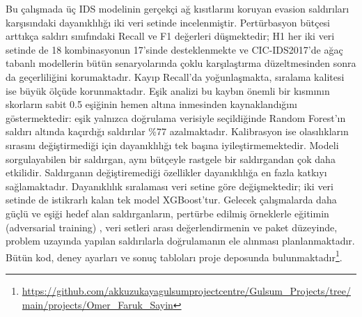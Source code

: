 \documentclass[conference]{IEEEtran}
\begin{document}
Bu çalışmada üç IDS modelinin gerçekçi ağ kısıtlarını koruyan evasion saldırıları karşısındaki dayanıklılığı iki veri setinde incelenmiştir. Pertürbasyon bütçesi arttıkça saldırı sınıfındaki Recall ve F1 değerleri düşmektedir; H1 her iki veri setinde de 18 kombinasyonun 17'sinde desteklenmekte ve CIC-IDS2017'de ağaç tabanlı modellerin bütün senaryolarında çoklu karşılaştırma düzeltmesinden sonra da geçerliliğini korumaktadır. Kayıp Recall'da yoğunlaşmakta, sıralama kalitesi ise büyük ölçüde korunmaktadır. Eşik analizi bu kaybın önemli bir kısmının skorların sabit 0.5 eşiğinin hemen altına inmesinden kaynaklandığını göstermektedir: eşik yalnızca doğrulama verisiyle seçildiğinde Random Forest'ın saldırı altında kaçırdığı saldırılar \%77 azalmaktadır. Kalibrasyon ise olasılıkların sırasını değiştirmediği için dayanıklılığı tek başına iyileştirmemektedir. Modeli sorgulayabilen bir saldırgan, aynı bütçeyle rastgele bir saldırgandan çok daha etkilidir. Saldırganın değiştiremediği özellikler dayanıklılığa en fazla katkıyı sağlamaktadır. Dayanıklılık sıralaması veri setine göre değişmektedir; iki veri setinde de istikrarlı kalan tek model XGBoost'tur. Gelecek çalışmalarda daha güçlü ve eşiği hedef alan saldırganların, pertürbe edilmiş örneklerle eğitimin (adversarial training) \cite{madry2018}, veri setleri arası değerlendirmenin ve paket düzeyinde, problem uzayında yapılan saldırılarla doğrulamanın ele alınması planlanmaktadır. Bütün kod, deney ayarları ve sonuç tabloları proje deposunda bulunmaktadır\footnote{\url{https://github.com/akkuzukayagulsumprojectcentre/Gulsum_Projects/tree/main/projects/Omer_Faruk_Sayin}}.
\end{document}
